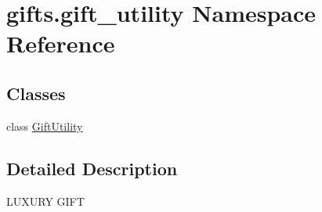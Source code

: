 \hypertarget{namespacegifts_1_1gift__utility}{}\section{gifts.\+gift\+\_\+utility Namespace Reference}
\label{namespacegifts_1_1gift__utility}
\subsection*{Classes}
\begin{DoxyCompactItemize}
\item 
class \hyperlink{classgifts_1_1gift__utility_1_1_gift_utility}{Gift\+Utility}
\end{DoxyCompactItemize}


\subsection{Detailed Description}
\begin{DoxyVerb}LUXURY GIFT\end{DoxyVerb}
 